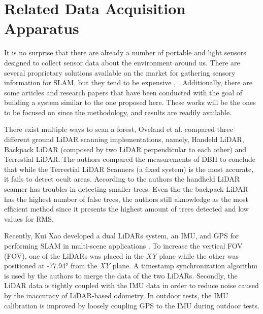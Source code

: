  
\section{Related Data Acquisition Apparatus}

It is no surprise that there are already a number of portable and light sensors designed to collect sensor data about the environment around us. There are several proprietary solutions available on the market for gathering sensory information for \acs*{SLAM}, but they tend to be expensive \cite{libackpack_C50}, \cite{libackpack_DGC50}. Additionally, there are some articles and research papers that have been conducted with the goal of building a system similar to the one proposed here. These works will be the ones to be focused on since the methodology, and results are readily available.

There exist multiple ways to scan a forest, Oveland et al. \cite{oveland_comparing_2018} compared three different ground LiDAR scanning implementations, namely, Handeld LiDAR, Backpack LiDAR (composed by two \acs*{LiDAR} perpendicular to each other) and Terrestial LiDAR. The authors compared the measurements of \acs*{DBH} to conclude that while the Terrestial LiDAR Scanners (a fixed system) is the most accurate, it fails to detect ocult areas. According to the authors the handheld LiDAR scanner has troubles in detecting smaller trees. Even tho the backpack LiDAR has the highest number of false trees, the authors still aknowledge as the most efficient method since it presents the highest amount of trees detected and low values for \acs*{RMS}.


Recently, Kui Xao developed a dual \acs*{LiDAR}s system, an \acs*{IMU}, and \acs*{GPS} for performing \acs*{SLAM} in multi-scene applications \cite{xiao_high-precision_2022}. To increase the vertical \acl*{FOV} (\acs*{FOV}), one of the \acs*{LiDAR}s was placed in the \textit{XY} plane while the other was positioned at -77.94° from the \textit{XY} plane. A timestamp synchronization algorithm is used by the authors to merge the data of the two \acs*{LiDAR}s. Secondly, the \acs*{LiDAR} data is tightly coupled with the IMU data in order to reduce noise caused by the inaccuracy of \acs*{LiDAR}-based odometry. In outdoor tests, the \acs*{IMU} calibration is improved by loosely coupling \acs*{GPS} to the \acs*{IMU} during outdoor tests.

